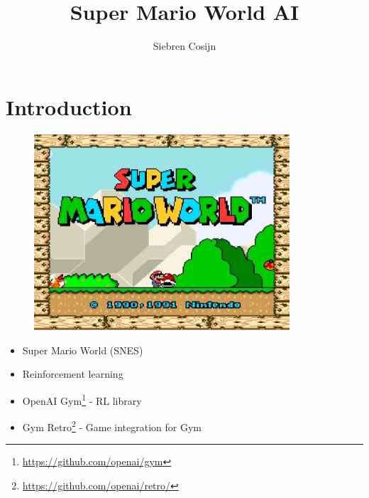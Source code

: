 \documentclass{article}
\title{Super Mario World AI}
\author{Siebren Cosijn}
\begin{document}
    \maketitle

    \section{Introduction}
    \begin{figure}[H]
        \centering
        \includegraphics[width=0.85\textwidth]{start-screen}
    \end{figure}
    \begin{itemize}
        \item Super Mario World (SNES)
        \item Reinforcement learning
        \item OpenAI Gym\footnote{\url{https://github.com/openai/gym}} - RL library
        \item Gym Retro\footnote{\url{https://github.com/openai/retro/}} - Game integration for Gym
    \end{itemize}
\end{document}
